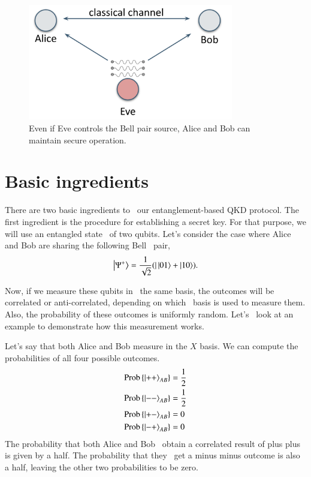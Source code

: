 \begin{figure}[H]
    \centering
    \includegraphics[width=0.8\textwidth]{lesson10/e91-eve-as-source.png}
        \caption[E91 with Eve as Bell pair source]{Even if Eve controls the Bell pair source, Alice and Bob can maintain secure operation.}
    \label{fig:eve-e91}
\end{figure}

\section{Basic ingredients}

There are two basic ingredients to 
our entanglement-based QKD protocol.
The first ingredient is the procedure for
establishing a secret key.
For that purpose, we will use an entangled state 
of two qubits.
Let's consider the case where Alice and Bob are sharing the following Bell 
pair,
\begin{align}
\left| \Psi^{+} \right\rangle=\frac{1}{\sqrt{2}}(|\left| 01 \right\rangle+\left| 10 \right\rangle).
\end{align}

Now, if we measure these qubits in 
the same basis, the outcomes will be
correlated or anti-correlated, depending on which 
basis is used to measure them. Also, the probability
of these outcomes is uniformly random. Let's 
look at an example to demonstrate how this measurement works.

Let's say that both Alice and Bob
measure in the $X$ basis. We can compute the 
probabilities of all four possible outcomes.
\begin{align}
\begin{aligned}
\operatorname{Prob}\left\{\left| ++ \right\rangle_{A B}\right\} &= \frac{1}{2} \\ 
\operatorname{Prob}\left\{\left| -- \right\rangle_{A B}\right\} &= \frac{1}{2} \\
\operatorname{Prob}\left\{\left| +- \right\rangle_{A B}\right\} &= 0 \\ 
\operatorname{Prob}\left\{\left| -+ \right\rangle_{A B}\right\} &= 0
\end{aligned}
\end{align}
The probability that both Alice and Bob 
obtain a correlated result of plus plus
is given by a half. The probability that they 
get a  minus minus outcome is also a half,
leaving the other two probabilities to be zero.


